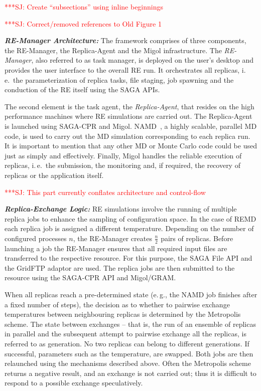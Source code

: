 \documentclass{rspublic}
\newcommand{\jhanote}[1]{ {\textcolor{red} { ***SJ: #1 }}}
\newcommand{\jhanote}[1]{}
\newcommand{\replicaagent}[1]{Replica-Agent }
\newcommand{\remanager}[1]{RE-Manager }
\begin{document}
\jhanote{Create ``subsections'' using inline beginnings}

\jhanote{Correct/removed references to Old Figure 1}

{\it \bf RE-Manager Architecture:} The
framework comprises of three components, the RE-Man\-ag\-er,
the Replica-Agent and the Migol infrastructure. 
The  \emph{RE-Manager}, also referred to as task manager,
is deployed on the user's desktop and provides the user interface 
to the overall RE run. It orchestrates all replicas, i.\,e.\ the 
parameterization of replica  tasks, file staging, job spawning 
and the conduction of the RE itself using the SAGA APIs.                                                                

The second element is the task agent, the \textit{Replica-Agent},
that resides on the high performance machines where RE simulations
are carried out. The \replicaagent\ is launched using SAGA-CPR and Migol.
NAMD~\citep{Phillips:2005gd}, a highly scalable, parallel MD code, is
used to carry out the MD simulation corresponding to each replica
run. It is important to mention that any other MD or
Monte Carlo code could be used just as simply and effectively.
Finally, Migol handles the reliable execution of replicas, i.\,e.\ the
submission, the monitoring and, if required, the recovery of replicas
or the application itself.




\jhanote{This part currently conflates architecture and control-flow}
                       
\noindent                                            
{\it \bf Replica-Exchange Logic:} RE simulations involve the running of multiple replica jobs to enhance
the sampling of configuration space. In the case of REMD each replica
job is assigned a different temperature.  Depending on the number of
configured processes $n$, the \remanager\ creates $\frac{n}{2}$ pairs
of replicas.  Before launching a job the \remanager\ ensures that all
required input files are transferred to the respective resource. For
this purpose, the SAGA File API and the GridFTP adaptor are used.  
The replica jobs are then submitted to the resource using the SAGA-CPR API and
Migol/GRAM. 

When all replicas reach a pre-determined state (e.\,g., the NAMD job
finishes after a fixed number of steps), the decision as to whether to
pairwise exchange temperatures between neighbouring replicas is
determined by the Metropolis scheme. %
The state between exchanges -- that is, the run of an ensemble of replicas
in parallel and the subsequent attempt to pairwise exchange all the
replicas, is referred to as generation. No two replicas can belong to
different generations.  If successful, parameters such as the
temperature, are swapped. Both jobs are then relaunched using the
mechanisms described above. Often the Metropolis scheme returns a
negative result, and an exchange is not carried out; thus it is
difficult to respond to a possible exchange speculatively.
\end{document}
